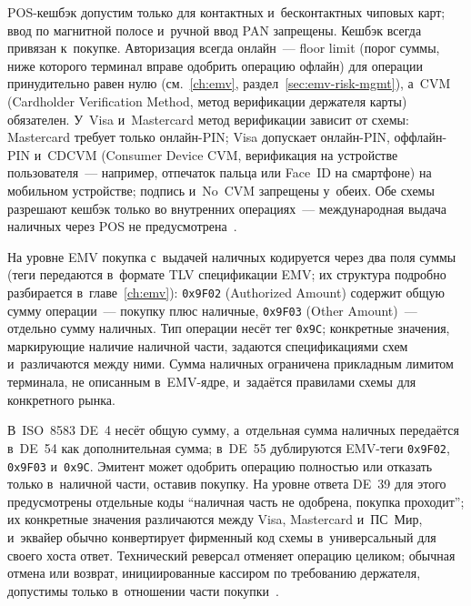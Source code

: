 POS-кешбэк допустим только для контактных и~бесконтактных чиповых
карт; ввод по магнитной полосе и~ручной ввод PAN запрещены. Кешбэк
всегда привязан к~покупке. Авторизация всегда онлайн~--- floor limit
(порог суммы, ниже которого терминал вправе одобрить операцию
офлайн) для операции принудительно равен нулю
(см.~\autoref{ch:emv}, раздел~\ref{sec:emv-risk-mgmt}),
а~CVM (Cardholder Verification Method, метод верификации держателя
карты) обязателен. У~Visa
и~Mastercard метод верификации зависит от схемы: Mastercard требует
только онлайн-PIN; Visa допускает онлайн-PIN, оффлайн-PIN и~CDCVM
(Consumer Device CVM, верификация на устройстве пользователя~---
например, отпечаток пальца или Face~ID на смартфоне)
на мобильном устройстве; подпись и~No~CVM запрещены у~обеих. Обе
схемы разрешают кешбэк только во внутренних операциях~---
международная выдача наличных через POS не
предусмотрена~\cite{visa-tadg,mc-tpr}.

На уровне EMV покупка с~выдачей наличных кодируется через два
поля суммы (теги передаются в~формате TLV спецификации EMV;
их структура подробно разбирается в~главе~\autoref{ch:emv}):
\texttt{0x9F02} (Authorized Amount) содержит общую
сумму операции~--- покупку плюс наличные, \texttt{0x9F03}
(Other Amount)~--- отдельно сумму наличных. Тип операции несёт
тег \texttt{0x9C}; конкретные значения, маркирующие наличие
наличной части, задаются спецификациями схем и~различаются между
ними. Сумма наличных ограничена прикладным лимитом терминала, не
описанным в~EMV-ядре, и~задаётся правилами схемы для конкретного
рынка.

В~ISO~8583 DE~4 несёт общую сумму, а~отдельная сумма наличных
передаётся в~DE~54 как дополнительная сумма; в~DE~55 дублируются
EMV-теги \texttt{0x9F02}, \texttt{0x9F03} и~\texttt{0x9C}. Эмитент
может одобрить операцию полностью или отказать только в~наличной
части, оставив покупку. На уровне ответа DE~39 для этого
предусмотрены отдельные коды \enquote{наличная часть не одобрена,
покупка проходит}; их конкретные значения различаются между Visa,
Mastercard и~ПС~Мир, и~эквайер обычно конвертирует фирменный
код схемы в~универсальный для своего хоста ответ. Технический
реверсал отменяет операцию целиком; обычная отмена или возврат,
инициированные кассиром по требованию держателя, допустимы только
в~отношении части покупки~\cite{visa-tadg,mc-tpr}.

